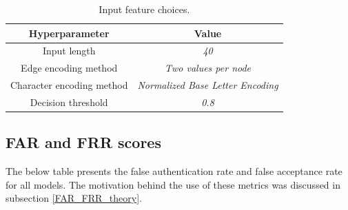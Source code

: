\begin{center}
	\begin{table}[H]
		
\begin{center}
	\begin{tabular}{ |c|c|} 
		\hline
		Hyperparameter & Value \\
		\hline
		Input length & \textit{40} \\ 
		\hline
		Edge encoding method & \textit{Two values per node} \\		
		\hline 
		Character encoding method & \textit{Normalized Base Letter Encoding} \\		 
		\hline
		Decision threshold & \textit{0.8} \\
		\hline
	\end{tabular}
\end{center}
	\caption{Input feature choices.}
	\label{table:hyperparams}
	\end{table}
\end{center}


\subsection{FAR and FRR scores}
The below table presents the false authentication rate and false acceptance rate for all models. The motivation behind the use of these metrics was discussed in subsection \ref{FAR_FRR_theory}.

